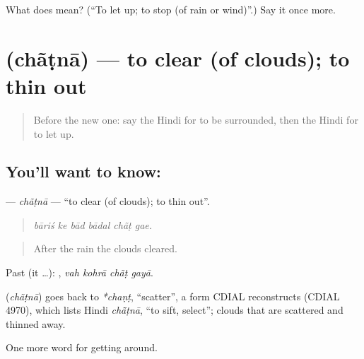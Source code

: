 \begin{tcolorbox}[breakable,colback=teal!4,colframe=teal!35!black,title={Before you move on}]
What does  mean? (\textquotedblleft{}To let up; to stop (of rain or wind)\textquotedblright{}.) Say it once more.
\end{tcolorbox}
\section[\texorpdfstring{\hi{छँटना} (chãṭnā)}{छँटना (chãṭnā)}]{ (chãṭnā) — to clear (of clouds); to thin out}

\label{lesson:HI-C440-chatnaintr}



\begin{quote}
Before the new one: say the Hindi for to be surrounded, then the Hindi for to let up.
\end{quote}

\subsection*{You'll want to know: }
\textbf{} — \emph{chãṭnā} — \textquotedblleft{}to clear (of clouds); to thin out\textquotedblright{}.

\begin{quote}
     
\end{quote}

\begin{quote}
\emph{bāriś ke bād bādal chãṭ gae.}
\end{quote}

\begin{quote}
After the rain the clouds cleared.
\end{quote}

Past (it …):    , \emph{vah kohrā chãṭ gayā}.

\begin{cousinweb}
\textbf{} (\emph{chãṭnā}) goes back to \emph{*chaṇṭ}, \textquotedblleft{}scatter\textquotedblright{}, a form CDIAL reconstructs (CDIAL 4970), which lists Hindi \emph{chā̃ṭnā}, \textquotedblleft{}to sift, select\textquotedblright{}; clouds that   are scattered and thinned away.
\end{cousinweb}

\begin{grammarlens}[title={What you've built}]
One more word for getting around.
\end{grammarlens}

